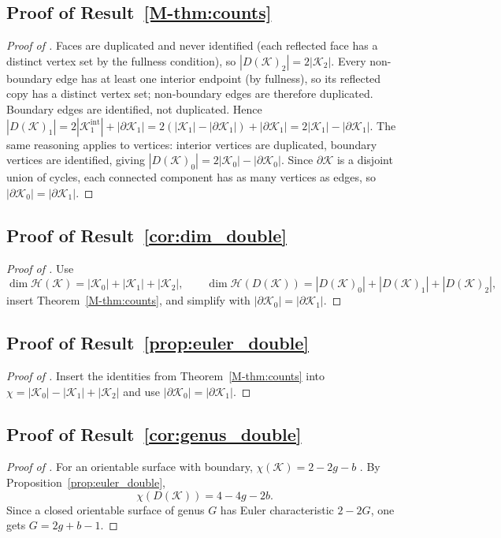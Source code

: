 \documentclass[11pt]{article}
\numberwithin{equation}{section}
\theoremstyle{definition}
\theoremstyle{remark}
\newcommand{\K}{\mathcal{K}}
\newcommand{\Hil}{\mathcal{H}}
\newcommand{\bd}{\partial}
\begin{document}
\subsection{Proof of Result~\ref{M-thm:counts}}\label{app:proof:thm:counts}
\begin{proof}[Proof of ]
Faces are duplicated and never identified (each reflected face has a distinct vertex set by the
fullness condition), so $|D(\K)_2|=2|\K_2|$. Every non-boundary edge has at least one interior endpoint
(by fullness), so its reflected copy has a distinct vertex set; non-boundary edges are therefore
duplicated. Boundary edges are identified, not duplicated. Hence
$|D(\K)_1|=2|\K_1^{\mathrm{int}}|+|\bd\K_1|=2(|\K_1|-|\bd\K_1|)+|\bd\K_1|=2|\K_1|-|\bd\K_1|$.
The same reasoning applies to vertices: interior vertices are duplicated, boundary vertices are
identified, giving $|D(\K)_0|=2|\K_0|-|\bd\K_0|$. Since $\bd\K$ is a disjoint union of cycles, each
connected component has as many vertices as edges, so $|\bd\K_0|=|\bd\K_1|$.
\end{proof}

\subsection{Proof of Result~\ref{cor:dim_double}}\label{app:proof:cor:dim_double}
\begin{proof}[Proof of ]
Use
\[
\dim\Hil(\K)=|\K_0|+|\K_1|+|\K_2|,
\qquad
\dim\Hil(D(\K))=|D(\K)_0|+|D(\K)_1|+|D(\K)_2|,
\]
insert Theorem~\ref{M-thm:counts}, and simplify with $|\bd\K_0|=|\bd\K_1|$.
\end{proof}

\subsection{Proof of Result~\ref{prop:euler_double}}\label{app:proof:prop:euler_double}
\begin{proof}[Proof of ]
Insert the identities from Theorem~\ref{M-thm:counts} into $\chi=|\K_0|-|\K_1|+|\K_2|$ and use $|\bd\K_0|=|\bd\K_1|$.
\end{proof}

\subsection{Proof of Result~\ref{cor:genus_double}}\label{app:proof:cor:genus_double}
\begin{proof}[Proof of ]
For an orientable surface with boundary, $\chi(\K)=2-2g-b$ \cite{Hatcher}. By Proposition~\ref{prop:euler_double},
\[
\chi(D(\K))=4-4g-2b.
\]
Since a closed orientable surface of genus $G$ has Euler characteristic $2-2G$, one gets $G=2g+b-1$.
\end{proof}
\end{document}
